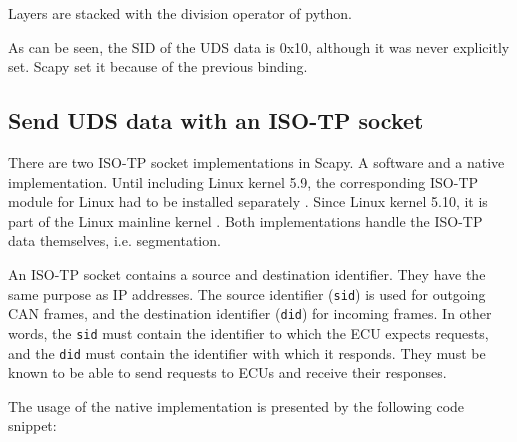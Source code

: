 Layers are stacked with the division operator of python.


As can be seen, the SID of the UDS data is 0x10, although it was never explicitly set. 
Scapy set it because of the previous binding.


\subsection{Send UDS data with an ISO-TP socket}

There are two ISO-TP socket implementations in Scapy. A software and a native implementation. 
Until including Linux kernel 5.9, the corresponding ISO-TP module for Linux had to be installed separately \cite{isotp-module}. Since Linux kernel 5.10, it is part of the Linux mainline kernel \cite{isotp-commit}. 
Both implementations handle the ISO-TP data themselves, i.e. segmentation.

An ISO-TP socket contains a source and destination identifier. 
They have the same purpose as IP addresses. 
The source identifier (\texttt{sid}) is used for outgoing CAN frames, and the destination identifier (\texttt{did}) for incoming frames.
In other words, the \texttt{sid} must contain the identifier to which the ECU expects requests, and the \texttt{did} must contain the identifier with which it responds. They must be known to be able to send requests to ECUs and receive their responses.


The usage of the native implementation is presented by the following code snippet:


